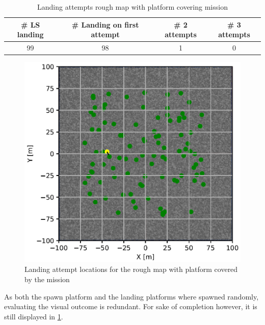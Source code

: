         \begin{table}[h]
            \begin{center}
             \caption{Landing attempts rough map with platform covering mission}\vspace{1ex}
             \label{tab:land_nums_rough_coverage}
             \begin{tabular}{|c|c|c|c|}
             \hline
             \# LS landing & \# Landing on first attempt & \# 2 attempts & \# 3 attempts\\ \hline \hline
             99 & 98 & 1 & 0 \\
             \hline
             \end{tabular}
            \end{center}
        \end{table}

        \begin{figure}[h]
        \centering
        \includegraphics[scale=0.5]{images/evaluation/landing_rough_covered.png}
        \caption{Landing attempt locations for the rough map with platform covered by the mission}
        \label{fig:land_rough_covered}
        \end{figure}

        As both the spawn platform and the landing platforms where spawned randomly, evaluating the visual outcome is redundant. For sake of completion however, it is still displayed in \cref{fig:land_rough_covered}.

